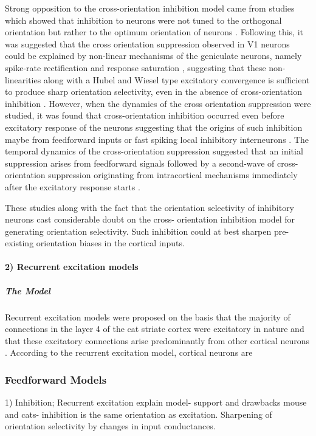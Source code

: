 Strong opposition to the cross-orientation inhibition model came from studies which showed that inhibition to neurons were not tuned to the orthogonal orientation but rather to the optimum orientation of neurons \cite{Anderson2000, Roerig2002, Tan2011a}. Following this, it was suggested that the cross orientation suppression observed in V1 neurons could be explained by non-linear mechanisms of the geniculate neurons, namely spike-rate rectification and response saturation \cite{Priebe2006}, suggesting that these non-linearities along with a Hubel and Wiesel type excitatory convergence is sufficient to produce sharp orientation selectivity, even in the absence of cross-orientation inhibition  \cite{Priebe2006, Priebe2012, Priebe2016}. However, when the dynamics of the cross orientation suppression were studied, it was found that cross-orientation inhibition occurred even before excitatory response of the neurons suggesting that the origins of such inhibition maybe from feedforward inputs or fast spiking local inhibitory interneurons \cite{Smith2006}. The temporal dynamics of the cross-orientation suppression suggested that an initial suppression arises from feedforward signals \cite{Freeman2002, Li2006} followed by a second-wave of cross-orientation suppression originating from intracortical mechanisms immediately after the excitatory response starts \cite{Kimura2009}.

These studies along with the fact that the orientation selectivity of inhibitory neurons cast considerable doubt on the cross- orientation inhibition model for generating orientation selectivity. Such inhibition could at best sharpen pre-existing orientation biases in the cortical inputs.

\paragraph{2) Recurrent excitation models}

\subparagraph{The Model}

Recurrent excitation models were proposed on the basis that the majority of connections in the layer 4 of the cat striate cortex were excitatory in nature and that these excitatory connections arise predominantly from other cortical neurons \cite{Douglas1995}. According to the recurrent excitation model, cortical neurons are 

\subsubsection{Feedforward Models}
1) Inhibition; Recurrent excitation
explain model- support and drawbacks
\cite{Tan2011a} mouse and cats- inhibition is the same orientation as excitation. Sharpening of orientation selectivity by changes in input conductances.

